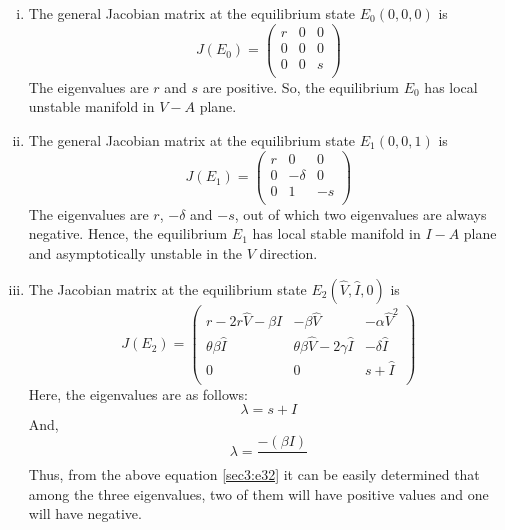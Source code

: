 \documentclass[12pt]{article}
\numberwithin{equation}{section}
\begin{document}
\begin{enumerate}[i).]
\item The general Jacobian matrix at the equilibrium state $E_0(0,0,0)$ is
\begin{equation}\label{sec3:e29}
J(E_0)=
\left({\begin{matrix}
	r & 0 & 0\\
	0 & 0 & 0\\
	0 & 0 & s\\
\end{matrix}}\right)
\end{equation}
The eigenvalues are $r$ and $s$ are positive. So, the equilibrium $E_0$ has local unstable manifold in $V-A$ plane.
\item The general Jacobian matrix at the equilibrium state $E_1(0,0,1)$ is
\begin{equation}\label{sec3:e30}
J(E_1)=
\left({\begin{matrix}
	r & 0 & 0\\
	0 & -\delta & 0\\
	0 & 1 & -s\\
\end{matrix}}\right)
\end{equation}
The eigenvalues are $r$, $-\delta$ and $-s$, out of which two eigenvalues are always negative. Hence, the equilibrium $E_1$ has local stable manifold in $I-A$ plane and asymptotically unstable in the $V$ direction.
\item The Jacobian matrix at the equilibrium state $E_2(\hat V, \hat I, 0)$ is
\begin{equation}\label{sec3:e31}
J(E_2)=
\left({\begin{matrix}
	r-2r\hat V-\beta I & -\beta \hat V & -\alpha \hat V^2\\
	\theta \beta \hat I & \theta \beta \hat V-2\gamma \hat I & -\delta \hat I\\
	0 & 0 & s+\hat I\\
\end{matrix}}\right)
\end{equation}
Here, the eigenvalues are as follows:
\begin{equation}
\lambda = s+I
\end{equation}
And,
\begin{equation}
\lambda = \frac{-(\beta I)}{}
\end{equation}
Thus, from the above equation \eqref{sec3:e32} it can be easily determined that among the three eigenvalues, two of them will have positive values and one will have negative.

\end{enumerate}
\end{document}
